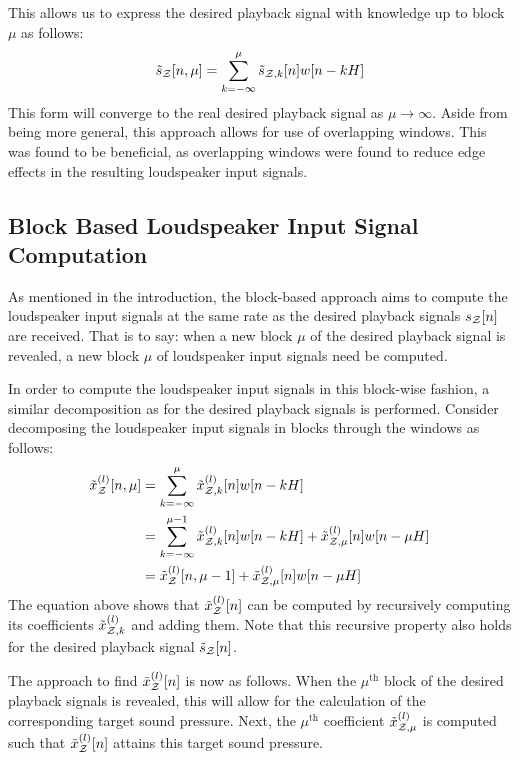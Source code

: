 This allows us to express the desired playback signal with knowledge up to block $\mu$ as follows:
\begin{align}
    \tilde{s}_{\mathcal{Z}}[n, \mu] = \sum_{k=-\infty}^{\mu} \tilde{s}_{\mathcal{Z},k}[n]w[n - kH]
\end{align}
This form will converge to the real desired playback signal as $\mu\to\infty$.
Aside from being more general, this approach allows for use of overlapping windows.
This was found to be beneficial, as overlapping windows were found to reduce edge effects in the resulting loudspeaker input signals.

\subsection{Block Based Loudspeaker Input Signal Computation}
As mentioned in the introduction, the block-based approach aims to compute the loudspeaker input signals at the same
rate as the desired playback signals $s_{\mathcal{Z}}[n]$ are received.
That is to say: when a new block $\mu$ of the desired playback signal is revealed, a new block $\mu$ of 
loudspeaker input signals need be computed.

In order to compute the loudspeaker input signals in this block-wise fashion, 
a similar decomposition as for the desired playback signals is performed.
Consider decomposing the loudspeaker input signals in blocks through the windows as follows:
\begin{align}
    \tilde{x}^{(l)}_{\mathcal{Z}}[n, \mu] &= \sum_{k=-\infty}^{\mu} \tilde{x}^{(l)}_{\mathcal{Z},k}[n]w[n - kH] \\
                           &= \sum_{k=-\infty}^{\mu - 1} \tilde{x}^{(l)}_{\mathcal{Z},k}[n]w[n - kH] 
                                + \tilde{x}^{(l)}_{\mathcal{Z},\mu}[n]w[n - \mu H] \\
                           &= \tilde{x}^{(l)}_{\mathcal{Z}}[n, \mu - 1] + \tilde{x}^{(l)}_{\mathcal{Z},\mu}[n]w[n - \mu H]
\end{align}
The equation above shows that $\tilde{x}^{(l)}_{\mathcal{Z}}[n]$ can be computed by recursively computing its coefficients
$\tilde{x}^{(l)}_{\mathcal{Z},k}$ and adding them.
Note that this recursive property also holds for the desired playback signal $\tilde{s}_{\mathcal{Z}}[n]$. 

The approach to find $\tilde{x}^{(l)}_{\mathcal{Z}}[n] $ is now as follows.
When the $\mu^\text{th}$ block of the desired playback signals is revealed, this will allow for the calculation of the 
corresponding target sound pressure.
Next, the $\mu^{\text{th}}$ coefficient $\tilde{x}^{(l)}_{\mathcal{Z},\mu}$ is computed such that $\tilde{x}^{(l)}_{\mathcal{Z}}[n]$
attains this target sound pressure.

